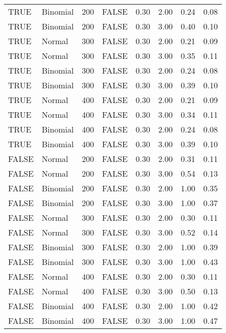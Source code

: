 \begin{table}[ht]
\begin{tabular}{llrlrrrr}
  TRUE & Binomial & 200 & FALSE & 0.30 & 2.00 & 0.24 & 0.08 \\ 
  TRUE & Binomial & 200 & FALSE & 0.30 & 3.00 & 0.40 & 0.10 \\ 
  TRUE & Normal & 300 & FALSE & 0.30 & 2.00 & 0.21 & 0.09 \\ 
  TRUE & Normal & 300 & FALSE & 0.30 & 3.00 & 0.35 & 0.11 \\ 
  TRUE & Binomial & 300 & FALSE & 0.30 & 2.00 & 0.24 & 0.08 \\ 
  TRUE & Binomial & 300 & FALSE & 0.30 & 3.00 & 0.39 & 0.10 \\ 
  TRUE & Normal & 400 & FALSE & 0.30 & 2.00 & 0.21 & 0.09 \\ 
  TRUE & Normal & 400 & FALSE & 0.30 & 3.00 & 0.34 & 0.11 \\ 
  TRUE & Binomial & 400 & FALSE & 0.30 & 2.00 & 0.24 & 0.08 \\ 
  TRUE & Binomial & 400 & FALSE & 0.30 & 3.00 & 0.39 & 0.10 \\ 
  FALSE & Normal & 200 & FALSE & 0.30 & 2.00 & 0.31 & 0.11 \\ 
  FALSE & Normal & 200 & FALSE & 0.30 & 3.00 & 0.54 & 0.13 \\ 
  FALSE & Binomial & 200 & FALSE & 0.30 & 2.00 & 1.00 & 0.35 \\ 
  FALSE & Binomial & 200 & FALSE & 0.30 & 3.00 & 1.00 & 0.37 \\ 
  FALSE & Normal & 300 & FALSE & 0.30 & 2.00 & 0.30 & 0.11 \\ 
  FALSE & Normal & 300 & FALSE & 0.30 & 3.00 & 0.52 & 0.14 \\ 
  FALSE & Binomial & 300 & FALSE & 0.30 & 2.00 & 1.00 & 0.39 \\ 
  FALSE & Binomial & 300 & FALSE & 0.30 & 3.00 & 1.00 & 0.43 \\ 
  FALSE & Normal & 400 & FALSE & 0.30 & 2.00 & 0.30 & 0.11 \\ 
  FALSE & Normal & 400 & FALSE & 0.30 & 3.00 & 0.50 & 0.13 \\ 
  FALSE & Binomial & 400 & FALSE & 0.30 & 2.00 & 1.00 & 0.42 \\ 
  FALSE & Binomial & 400 & FALSE & 0.30 & 3.00 & 1.00 & 0.47 \\ 
   \hline
\end{tabular}
\end{table}
